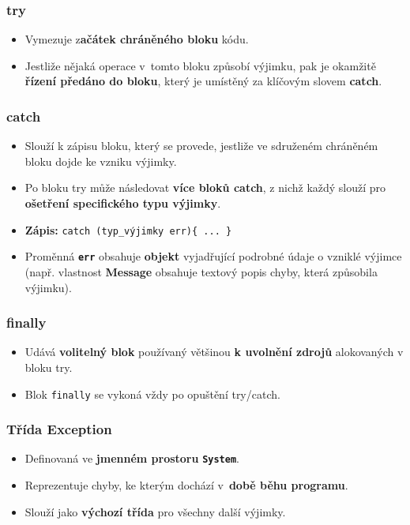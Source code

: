\subsubsection{try}
\begin{itemize}
\item Vymezuje z\textbf{ačátek chráněného bloku} kódu.
\item Jestliže nějaká operace v tomto bloku způsobí výjimku, pak je okamžitě \textbf{řízení předáno do bloku}, který je umístěný za klíčovým slovem \textbf{catch}.
\end{itemize}

\subsubsection{catch}
\begin{itemize}
\item Slouží k zápisu bloku, který se provede, jestliže ve sdruženém chráněném bloku dojde ke vzniku výjimky.
\item Po bloku try může následovat \textbf{více bloků catch}, z nichž každý slouží pro \textbf{ošetření specifického typu výjimky}.
\item \textbf{Zápis:} \texttt{catch (typ\_výjimky err)\{ ... \}}
\item Proměnná \texttt{\textbf{err}} obsahuje \textbf{objekt} vyjadřující podrobné údaje o vzniklé výjimce (např. vlastnost \textbf{Message} obsahuje textový popis chyby, která způsobila výjimku).
\end{itemize}

\subsubsection{finally}
\begin{itemize}
\item Udává \textbf{volitelný blok} používaný většinou \textbf{k uvolnění zdrojů} alokovaných v bloku try.
\item Blok \texttt{finally} se vykoná vždy po opuštění try/catch.
\end{itemize}

\subsubsection{Třída Exception}
\begin{itemize}
\item Definovaná ve \textbf{jmenném prostoru} \textbf{\texttt{System}}.
\item Reprezentuje chyby, ke kterým dochází v \textbf{době běhu programu}.
\item Slouží jako \textbf{výchozí třída} pro všechny další výjimky.
\end{itemize}

